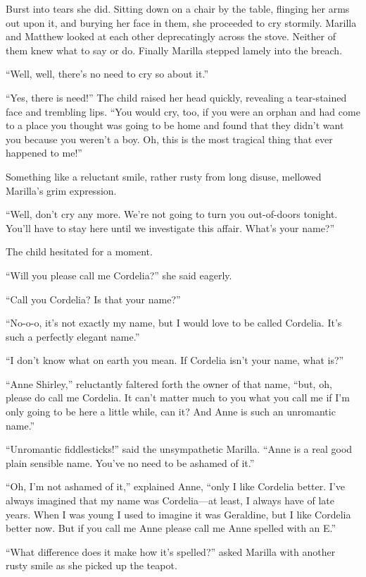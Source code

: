 \documentclass[a4paper]{article}
\begin{document}
Burst into tears she did. Sitting down on a chair by the table, flinging her arms out upon it, and burying her face in them, she proceeded to cry stormily. Marilla and Matthew looked at each other deprecatingly across the stove. Neither of them knew what to say or do. Finally Marilla stepped lamely into the breach.

``Well, well, there's no need to cry so about it.''

``Yes, there is need!'' The child raised her head quickly, revealing a tear-stained face and trembling lips. ``You would cry, too, if you were an orphan and had come to a place you thought was going to be home and found that they didn't want you because you weren't a boy. Oh, this is the most tragical thing that ever happened to me!''

Something like a reluctant smile, rather rusty from long disuse, mellowed Marilla's grim expression.

``Well, don't cry any more. We're not going to turn you out-of-doors tonight. You'll have to stay here until we investigate this affair. What's your name?''

The child hesitated for a moment.

``Will you please call me Cordelia?'' she said eagerly.

``Call you Cordelia? Is that your name?''

``No-o-o, it's not exactly my name, but I would love to be called Cordelia. It's such a perfectly elegant name.''

``I don't know what on earth you mean. If Cordelia isn't your name, what is?''

``Anne Shirley,'' reluctantly faltered forth the owner of that name, ``but, oh, please do call me Cordelia. It can't matter much to you what you call me if I'm only going to be here a little while, can it? And Anne is such an unromantic name.''

``Unromantic fiddlesticks!'' said the unsympathetic Marilla. ``Anne is a real good plain sensible name. You've no need to be ashamed of it.''

``Oh, I'm not ashamed of it,'' explained Anne, ``only I like Cordelia better. I've always imagined that my name was Cordelia—at least, I always have of late years. When I was young I used to imagine it was Geraldine, but I like Cordelia better now. But if you call me Anne please call me Anne spelled with an E.''

``What difference does it make how it's spelled?'' asked Marilla with another rusty smile as she picked up the teapot.
\end{document}
